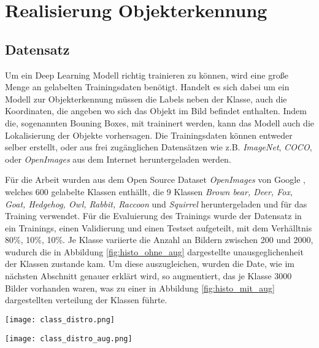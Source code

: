 \chapter{Realisierung Objekterkennung}\label{kap:object_det}

\section{Datensatz}\label{sec:dataset}

Um ein Deep Learning Modell richtig trainieren zu können, 
wird eine große Menge an gelabelten Trainingsdaten benötigt.
Handelt es sich dabei um ein Modell zur Objekterkennung
müssen die Labels neben der Klasse, auch die Koordinaten, 
die angeben wo sich das Objekt im Bild befindet enthalten. 
Indem die, sogenannten Bouning Boxes, mit traininert werden, 
kann das Modell auch die Lokalisierung der Objekte vorhersagen.
Die Trainingsdaten können entweder selber erstellt, oder 
aus frei zugänglichen Datensätzen wie z.B. \textit{ImageNet}, 
\textit{COCO}, oder \textit{OpenImages}
aus dem Internet heruntergeladen werden.

Für die Arbeit wurden aus dem Open Source Dataset
\textit{OpenImages} von Google
\cite{kuznetsovaOpenImagesDataset2018}, 
welches 600 gelabelte Klassen enthällt, 
die 9 Klassen \textit{Brown bear, Deer, Fox, Goat, 
Hedgehog, Owl, Rabbit, Raccoon} und \textit{Squirrel}
heruntergeladen und für das Training verwendet.
Für die Evaluierung des Trainings wurde der 
Datensatz in ein Trainings, einen Validierung und einen 
Testset aufgeteilt, mit dem Verhälltnis 80\%, 10\%, 10\%.
Je Klasse variierte die Anzahl an Bildern zwischen 200 und 
2000, wudurch die in Abbildung \ref{fig:histo_ohne_aug}
dargestellte unausgeglichenheit der Klassen zustande kam.
Um diese auszugleichen, wurden die Date, wie im nächsten Abschnitt 
genauer erklärt wird, so augmentiert, das je Klasse 3000 Bilder 
vorhanden waren, was zu einer in Abbildung \ref{fig:histo_mit_aug}
dargestellten verteilung der Klassen führte.

\vspace{1cm}
\begin{minipage}{0.5\textwidth}
    \centering
    \texttt{[image: class\_distro.png]}
    \label{fig:histo_ohne_aug}
\end{minipage}
\begin{minipage}{0.5\textwidth}
    \centering
    \texttt{[image: class\_distro\_aug.png]}
    \label{fig:histo_mit_aug}
\end{minipage}
\vspace{1cm}

